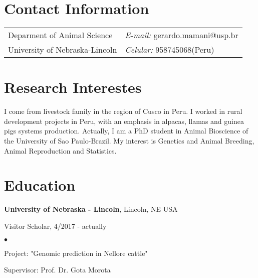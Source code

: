 \documentclass[margin,line,10pt]{res}
\newenvironment{list1}{
  \begin{list}{\ding{113}}{%
      \setlength{\itemsep}{0in}
      \setlength{\parsep}{0in} \setlength{\parskip}{0in}
      \setlength{\topsep}{0in} \setlength{\partopsep}{0in} 
      \setlength{\leftmargin}{0.17in}}}{\end{list}}
\newenvironment{list2}{
  \begin{list}{$\bullet$}{%
      \setlength{\itemsep}{0in}
      \setlength{\parsep}{0in} \setlength{\parskip}{0in}
      \setlength{\topsep}{0in} \setlength{\partopsep}{0in} 
      \setlength{\leftmargin}{0.2in}}}{\end{list}}
\begin{document}

\begin{resume}
\section{\sc Contact Information}
\vspace{.05in}
\begin{tabular}{@{}p{3in}p{4in}}
Deparment of Animal Science    & \hspace{2.5cm} {\it E-mail:}  gerardo.mamani@usp.br\\       
University of Nebraska-Lincoln  & \hspace{2.5cm} {\it Celular:} 958745068(Peru)\\     

\end{tabular}

\vspace{0.3cm}
\section{\sc Research Interestes}
I come from livestock family in the region of Cusco in Peru. I worked in rural development projects in Peru, with an emphasis in alpacas, llamas and guinea pigs systems production. Actually, I am a PhD student in Animal Bioscience of the University of Sao Paulo-Brazil. My interest is Genetics and Animal Breeding, Animal Reproduction and Statistics. 
 
\section{\sc Education}

{\bf University of Nebraska - Lincoln}, Lincoln, NE USA\\
\vspace*{-.1in}
\begin{list1}
\item[] Visitor Scholar, 4/2017 - actually
\begin{list2}
\vspace*{.05in}
\item Project: "Genomic prediction in Nellore cattle" 
\item Supervisor: Prof. Dr. Gota Morota
\end{list2}
\vspace*{.05in}
\end{list1}


\end{resume}
\end{document}
